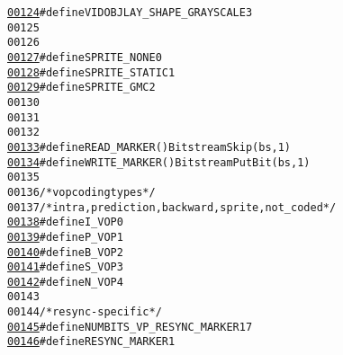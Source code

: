 \begin{footnotesize}
\begin{alltt}
\hypertarget{_bitstream_8h_source_l00124}{}\hyperlink{_bitstream_8h_a7a7ae8783626f8399d7422e3fe469fd3}{00124} \textcolor{preprocessor}{}\textcolor{preprocessor}{#define VIDOBJLAY\_SHAPE\_GRAYSCALE               3}
00125 \textcolor{preprocessor}{}
00126 
\hypertarget{_bitstream_8h_source_l00127}{}\hyperlink{_bitstream_8h_a0c741ee93be1feaaa180348399eda91f}{00127} \textcolor{preprocessor}{#define SPRITE\_NONE             0}
\hypertarget{_bitstream_8h_source_l00128}{}\hyperlink{_bitstream_8h_a06e7f9f76ced7eed593b14a9e084fc1d}{00128} \textcolor{preprocessor}{}\textcolor{preprocessor}{#define SPRITE\_STATIC   1}
\hypertarget{_bitstream_8h_source_l00129}{}\hyperlink{_bitstream_8h_a1af0fda3992f0f31fedd7242baf25447}{00129} \textcolor{preprocessor}{}\textcolor{preprocessor}{#define SPRITE\_GMC              2}
00130 \textcolor{preprocessor}{}
00131 
00132 
\hypertarget{_bitstream_8h_source_l00133}{}\hyperlink{_bitstream_8h_a0ff1b842437ed8e28ed060c2b19220df}{00133} \textcolor{preprocessor}{#define READ\_MARKER()   BitstreamSkip(bs, 1)}
\hypertarget{_bitstream_8h_source_l00134}{}\hyperlink{_bitstream_8h_a4f1e9b9ced4a14e93577c5875424643a}{00134} \textcolor{preprocessor}{}\textcolor{preprocessor}{#define WRITE\_MARKER()  BitstreamPutBit(bs, 1)}
00135 \textcolor{preprocessor}{}
00136 \textcolor{comment}{/* vop coding types  */}
00137 \textcolor{comment}{/* intra, prediction, backward, sprite, not\_coded */}
\hypertarget{_bitstream_8h_source_l00138}{}\hyperlink{_bitstream_8h_af8c67a960cc502d8130020f116f5bd7f}{00138} \textcolor{preprocessor}{#define I\_VOP   0}
\hypertarget{_bitstream_8h_source_l00139}{}\hyperlink{_bitstream_8h_ae26c00dbf5c8c92fe4513b64f1135154}{00139} \textcolor{preprocessor}{}\textcolor{preprocessor}{#define P\_VOP   1}
\hypertarget{_bitstream_8h_source_l00140}{}\hyperlink{_bitstream_8h_ad08ba34fde9c839a62e98a841c961caf}{00140} \textcolor{preprocessor}{}\textcolor{preprocessor}{#define B\_VOP   2}
\hypertarget{_bitstream_8h_source_l00141}{}\hyperlink{_bitstream_8h_a7a44beaaf4bfa528ff1368e087d5a374}{00141} \textcolor{preprocessor}{}\textcolor{preprocessor}{#define S\_VOP   3}
\hypertarget{_bitstream_8h_source_l00142}{}\hyperlink{_bitstream_8h_a4076c55965ae4f8f034c9e62eef0ea00}{00142} \textcolor{preprocessor}{}\textcolor{preprocessor}{#define N\_VOP   4}
00143 \textcolor{preprocessor}{}
00144 \textcolor{comment}{/* resync-specific */}
\hypertarget{_bitstream_8h_source_l00145}{}\hyperlink{_bitstream_8h_a4601bdcd7517a32258a47870774a0d22}{00145} \textcolor{preprocessor}{#define NUMBITS\_VP\_RESYNC\_MARKER  17}
\hypertarget{_bitstream_8h_source_l00146}{}\hyperlink{_bitstream_8h_afe4d4b8917759e79abff36fab5284a07}{00146} \textcolor{preprocessor}{}\textcolor{preprocessor}{#define RESYNC\_MARKER 1}

\end{alltt}
\end{footnotesize}
